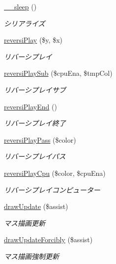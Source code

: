 \begin{DoxyCompactItemize}
\hyperlink{class_reversi_play_aaf11785905da71774e052912d784e3b4}{\+\_\+\+\_\+sleep} ()
\begin{DoxyCompactList}\small\item\em シリアライズ \end{DoxyCompactList}\item 
\hyperlink{class_reversi_play_a017d2d85f7c5c6917f528f30452d72d0}{reversi\+Play} (\$y, \$x)
\begin{DoxyCompactList}\small\item\em リバーシプレイ \end{DoxyCompactList}\item 
\hyperlink{class_reversi_play_a990fc6e45b7bdf2dab569f087f8b5a62}{reversi\+Play\+Sub} (\$cpu\+Ena, \$tmp\+Col)
\begin{DoxyCompactList}\small\item\em リバーシプレイサブ \end{DoxyCompactList}\item 
\hyperlink{class_reversi_play_af55fe6b6f2005c7da80c696ed692783d}{reversi\+Play\+End} ()
\begin{DoxyCompactList}\small\item\em リバーシプレイ終了 \end{DoxyCompactList}\item 
\hyperlink{class_reversi_play_a67816fe65a87e35d8e8cc35d5d269bcb}{reversi\+Play\+Pass} (\$color)
\begin{DoxyCompactList}\small\item\em リバーシプレイパス \end{DoxyCompactList}\item 
\hyperlink{class_reversi_play_a6514ad9244af720ee1ec1777c11e80fb}{reversi\+Play\+Cpu} (\$color, \$cpu\+Ena)
\begin{DoxyCompactList}\small\item\em リバーシプレイコンピューター \end{DoxyCompactList}\item 
\hyperlink{class_reversi_play_a52029e5f2e049767d1f67c3f5c18ce9f}{draw\+Update} (\$assist)
\begin{DoxyCompactList}\small\item\em マス描画更新 \end{DoxyCompactList}\item 
\hyperlink{class_reversi_play_a3ae28eb121caf59932218ea7d1fca81d}{draw\+Update\+Forcibly} (\$assist)
\begin{DoxyCompactList}\small\item\em マス描画強制更新 \end{DoxyCompactList}\item 

\end{DoxyCompactItemize}
